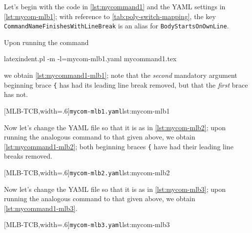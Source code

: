 	Let's begin with the code in \cref{lst:mycommand1} and the YAML settings in
	\cref{lst:mycom-mlb1}; with reference to \vref{tab:poly-switch-mapping}, the key
	\texttt{CommandNameFinishesWithLineBreak} is an alias for \texttt{BodyStartsOnOwnLine}.


	Upon running the command  
	\begin{commandshell}
latexindent.pl -m -l=mycom-mlb1.yaml mycommand1.tex
\end{commandshell}
	we obtain \cref{lst:mycommand1-mlb1}; note that the \emph{second} mandatory argument
	beginning brace \lstinline!{! has had its leading line break removed, but that the
	\emph{first} brace has not.

	\begin{cmhtcbraster}[
			raster force size=false,
			raster column 1/.style={add to width=-1cm},
		]
		[MLB-TCB,width=.6\textwidth]{\texttt{mycom-mlb1.yaml}}{lst:mycom-mlb1}
	\end{cmhtcbraster}

	Now let's change the YAML file so that it is as in \cref{lst:mycom-mlb2}; upon running
	the analogous command to that given above, we obtain \cref{lst:mycommand1-mlb2}; both
	beginning braces \lstinline!{! have had their leading line breaks removed.

	\begin{cmhtcbraster}[
			raster force size=false,
			raster column 1/.style={add to width=-1cm},
		]
		[MLB-TCB,width=.6\textwidth]{\texttt{mycom-mlb2.yaml}}{lst:mycom-mlb2}
	\end{cmhtcbraster}

	Now let's change the YAML file so that it is as in \cref{lst:mycom-mlb3}; upon running
	the analogous command to that given above, we obtain \cref{lst:mycommand1-mlb3}.

	\begin{cmhtcbraster}[
			raster force size=false,
			raster column 1/.style={add to width=-1cm},
		]
		[MLB-TCB,width=.6\textwidth]{\texttt{mycom-mlb3.yaml}}{lst:mycom-mlb3}
	\end{cmhtcbraster}

